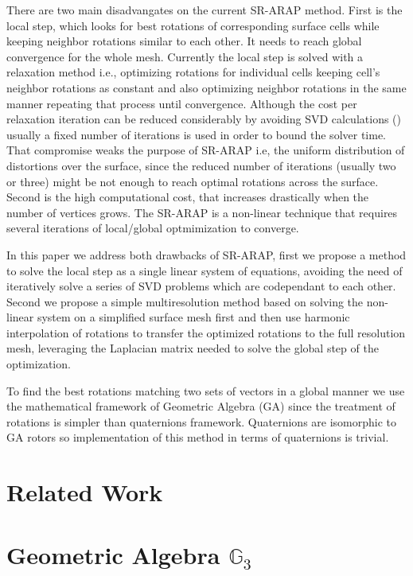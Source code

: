 \documentclass{birkjour}
\numberwithin{equation}{section}
\begin{document}
There are two main disadvangates on the current SR-ARAP method. First is the local step, which looks for best rotations of corresponding surface cells while keeping neighbor rotations similar to each other. It needs to reach global convergence for the whole mesh. Currently the local step is solved with a relaxation method i.e., optimizing rotations for individual cells keeping cell's neighbor rotations as constant and also optimizing neighbor rotations in the same manner repeating that process until convergence. Although the cost per relaxation iteration can be reduced considerably by avoiding SVD calculations (\cite{Ligare2020}) usually a fixed number of iterations is used in order to bound the solver time. That compromise weaks the purpose of SR-ARAP i.e, the uniform distribution of distortions over the surface, since the reduced number of iterations (usually two or three) might be not enough to reach optimal rotations across the surface. Second is the high computational cost, that increases drastically when the number of vertices grows. The SR-ARAP is a non-linear technique that requires several iterations of local/global optmimization to converge.

In this paper we address both drawbacks of SR-ARAP, first we propose a method to solve the local step as a single linear system of equations, avoiding the need of iteratively solve a series of SVD problems which are codependant to each other. Second we propose a simple multiresolution method based on solving the non-linear system on a simplified surface mesh first and then use harmonic interpolation of rotations to transfer the optimized rotations to the full resolution mesh, leveraging the Laplacian matrix needed to solve the global step of the optimization.

To find the best rotations matching two sets of vectors in a global manner we use the mathematical framework of Geometric Algebra (GA) since the treatment of rotations is simpler than quaternions framework. Quaternions are isomorphic to GA rotors so implementation of this method in terms of quaternions is trivial.

\section{Related Work}

\section{Geometric Algebra $\mathbb{G}_3$}
\end{document}

